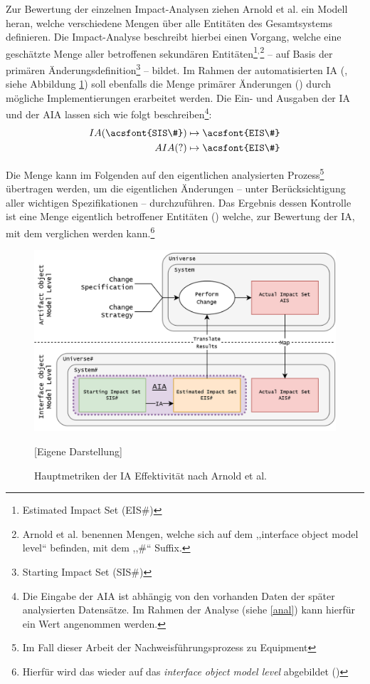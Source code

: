     Zur Bewertung der einzelnen Impact-Analysen ziehen Arnold et al. ein Modell heran, welche verschiedene Mengen über alle Entitäten des Gesamtsystems definieren.
    Die Impact-Analyse beschreibt hierbei einen Vorgang, welche eine geschätzte Menge aller betroffenen sekundären Entitäten\footnote{Estimated Impact Set (EIS\#)}$^,$\footnote{Arnold et al. benennen Mengen, welche sich auf dem ,,interface object model level`` befinden, mit dem ,,\#`` Suffix.} -- auf Basis der primären Änderungsdefinition\footnote{Starting Impact Set (SIS\#)} -- bildet.
    Im Rahmen der automatisierten \ac{IA} (, siehe Abbildung \ref{fig:aia}) soll ebenfalls die Menge primärer Änderungen () durch mögliche Implementierungen erarbeitet werden.
    Die Ein- und Ausgaben der \acf{IA} und der \acf{AIA} lassen sich wie folgt beschreiben\footnote{Die Eingabe der \ac{AIA} ist abhängig von den vorhanden Daten der später analysierten Datensätze. Im Rahmen der Analyse (siehe \ref{anal}) kann hierfür ein Wert angenommen werden.}:
    \begin{align}
        IA(\text{\acsfont{SIS\#}}) &\mapsto \text{\acsfont{EIS\#}} \\
        AIA(?)                     &\mapsto \text{\acsfont{EIS\#}}
    \end{align}
    
    \noindent
    Die  Menge kann im Folgenden auf den eigentlichen analysierten Prozess\footnote{Im Fall dieser Arbeit der Nachweisführungsprozess zu \atmans{} Equipment} übertragen werden, um die eigentlichen Änderungen -- unter Berücksichtigung  aller wichtigen Spezifikationen -- durchzuführen.
    Das Ergebnis dessen Kontrolle ist eine Menge eigentlich betroffener Entitäten () welche, zur Bewertung der \ac{IA}, mit dem  verglichen werden kann.\footnote{Hierfür wird das  wieder auf das \textit{interface object model level} abgebildet ()}
    
    \begin{figure}[H]
        \centering
        \includegraphics[width=1\linewidth]{gfx/IA35.drawio.png}
        \caption{Hauptmetriken der \ac{IA} Effektivität nach Arnold et al. \cite[296]{app_bohner}}
        [Eigene Darstellung]
        \label{fig:aia}
    \end{figure}
    
